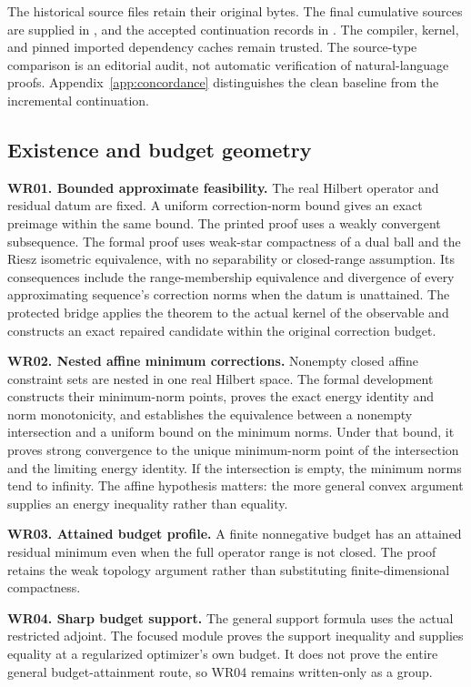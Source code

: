 The historical source files retain their original bytes. The final cumulative sources are supplied in , and the accepted continuation records in . The compiler, kernel, and pinned imported dependency caches remain trusted. The source-type comparison is an editorial audit, not automatic verification of natural-language proofs. Appendix~\ref{app:concordance} distinguishes the clean baseline from the incremental continuation.

\subsection{Existence and budget geometry}
\textbf{WR01. Bounded approximate feasibility.} The real Hilbert operator and residual datum are fixed. A uniform correction-norm bound gives an exact preimage within the same bound. The printed proof uses a weakly convergent subsequence. The formal proof uses weak-star compactness of a dual ball and the Riesz isometric equivalence, with no separability or closed-range assumption. Its consequences include the range-membership equivalence and divergence of every approximating sequence's correction norms when the datum is unattained. The protected bridge applies the theorem to the actual kernel of the observable and constructs an exact repaired candidate within the original correction budget.

\textbf{WR02. Nested affine minimum corrections.} Nonempty closed affine constraint sets are nested in one real Hilbert space. The formal development constructs their minimum-norm points, proves the exact energy identity and norm monotonicity, and establishes the equivalence between a nonempty intersection and a uniform bound on the minimum norms. Under that bound, it proves strong convergence to the unique minimum-norm point of the intersection and the limiting energy identity. If the intersection is empty, the minimum norms tend to infinity. The affine hypothesis matters: the more general convex argument supplies an energy inequality rather than equality.

\textbf{WR03. Attained budget profile.} A finite nonnegative budget has an attained residual minimum even when the full operator range is not closed. The proof retains the weak topology argument rather than substituting finite-dimensional compactness.

\textbf{WR04. Sharp budget support.} The general support formula uses the actual restricted adjoint. The focused module proves the support inequality and supplies equality at a regularized optimizer's own budget. It does not prove the entire general budget-attainment route, so WR04 remains written-only as a group.

